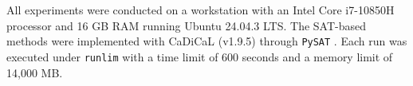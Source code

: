 \documentclass[letterpaper,journal]{IEEEtran}
\begin{document}
All experiments were conducted on a workstation with an Intel Core i7-10850H processor and 16 GB RAM running Ubuntu 24.04.3 LTS. The SAT-based methods were implemented with CaDiCaL (v1.9.5) through \texttt{PySAT} \cite{imms-sat18,itk-sat24}. Each run was executed under \texttt{runlim} with a time limit of 600 seconds and a memory limit of 14,000 MB.
\end{document}
